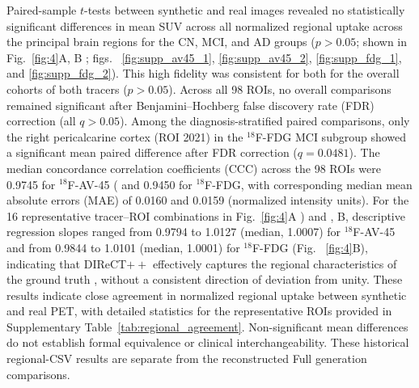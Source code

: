 \documentclass{article}
\providecommand{\DIFaddtex}[1]{{\protect\color{blue} \sf #1}} %
\providecommand{\DIFdeltex}[1]{{\protect\color{red} \scriptsize #1}} %
\providecommand{\DIFaddbegin}{} %
\providecommand{\DIFaddend}{} %
\providecommand{\DIFdelbegin}{} %
\providecommand{\DIFdelend}{} %
\providecommand{\DIFadd}[1]{\texorpdfstring{\DIFaddtex{#1}}{#1}} %
\providecommand{\DIFdel}[1]{\texorpdfstring{\DIFdeltex{#1}}{}} %
\newcommand{\DIFscaledelfig}{0.5}
\newlength{\DIFdelgraphicswidth} %
\newlength{\DIFdelgraphicsheight} %
\newcommand{\DIFaddincludegraphics}[2][]{{\color{blue}\fbox{\DIFOincludegraphics[#1]{#2}}}} %
\newcommand{\DIFdelincludegraphics}[2][]{%
\sbox{\DIFdelgraphicsbox}{\DIFOincludegraphics[#1]{#2}}%
\settoboxwidth{\DIFdelgraphicswidth}{\DIFdelgraphicsbox} %
\settoboxtotalheight{\DIFdelgraphicsheight}{\DIFdelgraphicsbox} %
\scalebox{\DIFscaledelfig}{%
\parbox[b]{\DIFdelgraphicswidth}{\usebox{\DIFdelgraphicsbox}\\[-\baselineskip] \rule{\DIFdelgraphicswidth}{0em}}\llap{\resizebox{\DIFdelgraphicswidth}{\DIFdelgraphicsheight}{%
\setlength{\unitlength}{\DIFdelgraphicswidth}%
\begin{picture}(1,1)%
\thicklines\linethickness{2pt} %
{\color[rgb]{1,0,0}\put(0,0){\framebox(1,1){}}}%
{\color[rgb]{1,0,0}\put(0,0){\line( 1,1){1}}}%
{\color[rgb]{1,0,0}\put(0,1){\line(1,-1){1}}}%
\end{picture}%
}\hspace*{3pt}}} %
} %
\DeclareRobustCommand{\DIFaddbegin}{\DIFOaddbegin \let\includegraphics\DIFaddincludegraphics} %
\DeclareRobustCommand{\DIFaddend}{\DIFOaddend \let\includegraphics\DIFOincludegraphics} %
\DeclareRobustCommand{\DIFdelbegin}{\DIFOdelbegin \let\includegraphics\DIFdelincludegraphics} %
\DeclareRobustCommand{\DIFdelend}{\DIFOaddend \let\includegraphics\DIFOincludegraphics} %
\begin{document}
Paired-sample $t$-tests between synthetic and real images revealed no statistically significant differences in \DIFdelbegin \DIFdel{mean SUV across all }\DIFdelend \DIFaddbegin \DIFadd{normalized regional uptake across the }\DIFaddend principal brain regions \DIFdelbegin \DIFdel{for the CN, MCI, and AD groups ($p>0.05$; }\DIFdelend \DIFaddbegin \DIFadd{shown in }\DIFaddend Fig.~\ref{fig:4}A, B \DIFdelbegin \DIFdel{; figs. ~\ref{fig:supp_av45_1}, \ref{fig:supp_av45_2}, \ref{fig:supp_fdg_1}, and \ref{fig:supp_fdg_2}). This high fidelity was consistent for both }\DIFdelend \DIFaddbegin \DIFadd{for the overall cohorts of both tracers ($p>0.05$). Across all 98 ROIs, no overall comparisons remained significant after Benjamini--Hochberg false discovery rate (FDR) correction (all $q>0.05$). Among the diagnosis-stratified paired comparisons, only the right pericalcarine cortex (ROI 2021) in the $^{18}$F-FDG MCI subgroup showed a significant mean paired difference after FDR correction ($q=0.0481$). The median concordance correlation coefficients (CCC) across the 98 ROIs were 0.9745 for }\DIFaddend $^{18}$F-AV-45 \DIFdelbegin \DIFdel{(}\DIFdelend \DIFaddbegin \DIFadd{and 0.9450 for $^{18}$F-FDG, with corresponding median mean absolute errors (MAE) of 0.0160 and 0.0159 (normalized intensity units). For the 16 representative tracer--ROI combinations in }\DIFaddend Fig.~\ref{fig:4}A\DIFdelbegin \DIFdel{) and }\DIFdelend \DIFaddbegin \DIFadd{, B, descriptive regression slopes ranged from 0.9794 to 1.0127 (median, 1.0007) for $^{18}$F-AV-45 and from 0.9844 to 1.0101 (median, 1.0001) for }\DIFaddend $^{18}$F-FDG\DIFdelbegin \DIFdel{(Fig. ~\ref{fig:4}B), indicating that DIReCT$++$ effectively captures the regional characteristics of the ground truth}\DIFdelend \DIFaddbegin \DIFadd{, without a consistent direction of deviation from unity. These results indicate close agreement in normalized regional uptake between synthetic and real PET, with detailed statistics for the representative ROIs provided in Supplementary Table~\ref{tab:regional_agreement}. Non-significant mean differences do not establish formal equivalence or clinical interchangeability. These historical regional-CSV results are separate from the reconstructed Full generation comparisons}\DIFaddend .
\end{document}
